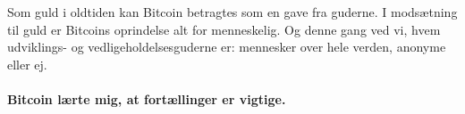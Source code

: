 Som guld i oldtiden kan Bitcoin betragtes som en gave fra guderne. I modsætning 
til guld er Bitcoins oprindelse alt for menneskelig. Og denne gang ved vi, 
hvem udviklings- og vedligeholdelsesguderne er: mennesker over hele verden, 
anonyme eller ej.

\paragraph{Bitcoin lærte mig, at fortællinger er vigtige.}

%
%
%
%
